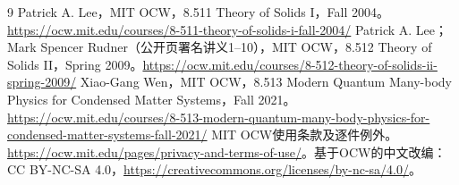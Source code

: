 \begin{thebibliography}{9}
 Patrick A. Lee，MIT OCW，8.511 Theory of Solids I，Fall 2004。\url{https://ocw.mit.edu/courses/8-511-theory-of-solids-i-fall-2004/}
 Patrick A. Lee；Mark Spencer Rudner（公开页署名讲义1--10），MIT OCW，8.512 Theory of Solids II，Spring 2009。\url{https://ocw.mit.edu/courses/8-512-theory-of-solids-ii-spring-2009/}
 Xiao-Gang Wen，MIT OCW，8.513 Modern Quantum Many-body Physics for Condensed Matter Systems，Fall 2021。\url{https://ocw.mit.edu/courses/8-513-modern-quantum-many-body-physics-for-condensed-matter-systems-fall-2021/}
 MIT OCW使用条款及逐件例外。\url{https://ocw.mit.edu/pages/privacy-and-terms-of-use/}。基于OCW的中文改编：CC BY-NC-SA 4.0，\url{https://creativecommons.org/licenses/by-nc-sa/4.0/}。
\end{thebibliography}
